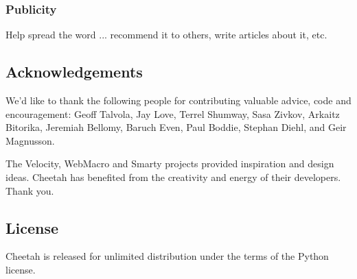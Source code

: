 \subsubsection{Publicity}
Help spread the word ... recommend it to others, write articles about it, etc.

\subsection{Acknowledgements}
\label{intro.acknowledgments}
    
We'd like to thank the following people for contributing valuable advice, code
and encouragement: Geoff Talvola, Jay Love, Terrel Shumway, Sasa Zivkov, Arkaitz
Bitorika, Jeremiah Bellomy, Baruch Even, Paul Boddie, Stephan Diehl, and Geir
Magnusson.
    
The Velocity, WebMacro and Smarty projects provided inspiration and design
ideas.  Cheetah has benefited from the creativity and energy of their
developers. Thank you.

\subsection{License}
\label{intro.license}

Cheetah is released for unlimited distribution under the terms of the
Python license.

